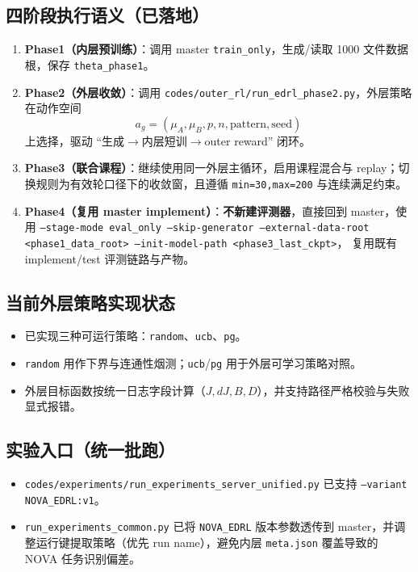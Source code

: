 \documentclass[UTF8,11pt,a4paper]{ctexart}
\begin{document}
\subsection{四阶段执行语义（已落地）}
\begin{enumerate}
\item \textbf{Phase1（内层预训练）}：调用 master \texttt{train\_only}，生成/读取 1000 文件数据根，保存 \texttt{theta\_phase1}。
\item \textbf{Phase2（外层收敛）}：调用 \texttt{codes/outer\_rl/run\_edrl\_phase2.py}，外层策略在动作空间
\[
a_g=(\mu_A,\mu_B,p,n,\text{pattern},\text{seed})
\]
上选择，驱动 ``生成$\rightarrow$内层短训$\rightarrow$outer reward'' 闭环。
\item \textbf{Phase3（联合课程）}：继续使用同一外层主循环，启用课程混合与 replay；切换规则为有效轮口径下的收敛窗，且遵循 \texttt{min=30,max=200} 与连续满足约束。
\item \textbf{Phase4（复用 master implement）}：\textbf{不新建评测器}，直接回到 master，使用
\texttt{--stage-mode eval\_only --skip-generator --external-data-root <phase1\_data\_root> --init-model-path <phase3\_last\_ckpt>}，
复用既有 implement/test 评测链路与产物。
\end{enumerate}

\subsection{当前外层策略实现状态}
\begin{itemize}
\item 已实现三种可运行策略：\texttt{random}、\texttt{ucb}、\texttt{pg}。
\item \texttt{random} 用作下界与连通性烟测；\texttt{ucb}/\texttt{pg} 用于外层可学习策略对照。
\item 外层目标函数按统一日志字段计算（\(J,dJ,B,D\)），并支持路径严格校验与失败显式报错。
\end{itemize}

\subsection{实验入口（统一批跑）}
\begin{itemize}
\item \texttt{codes/experiments/run\_experiments\_server\_unified.py} 已支持
\texttt{--variant NOVA\_EDRL:v1}。
\item \texttt{run\_experiments\_common.py} 已将 \texttt{NOVA\_EDRL} 版本参数透传到 master，并调整运行键提取策略（优先 run name），避免内层 \texttt{meta.json} 覆盖导致的 NOVA 任务识别偏差。
\end{itemize}
\end{document}
